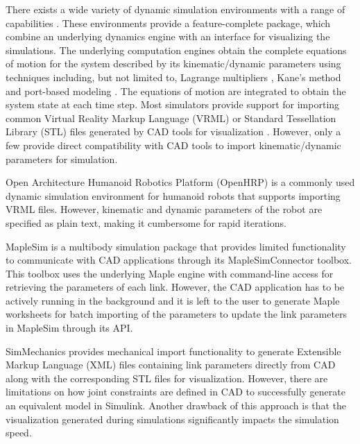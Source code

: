 There exists a wide variety of dynamic simulation environments with a range of capabilities \cite{Koenig04designand,michel2004webotstm, Kanehiro:2004dq, PonticelliCWR2006, Reichenbach2009, MedranoCerda2010}. These environments provide a feature-complete package, which combine an underlying dynamics engine with an interface for visualizing the simulations. The underlying computation engines obtain the complete equations of motion for the system described by its kinematic/dynamic parameters using techniques including, but not limited to, Lagrange multipliers \cite{Baraff1996}, Kane's method \cite{Rosenthal1986} and port-based modeling \cite{Paredis2001}. The equations of motion are integrated to obtain the system state at each time step. Most simulators provide support for importing common Virtual Reality Markup Language (VRML) or Standard Tessellation Library (STL) files generated by CAD tools for visualization \cite{Koenig04designand,michel2004webotstm}. However, only a few provide direct compatibility with CAD tools to import kinematic/dynamic parameters for simulation.

Open Architecture Humanoid Robotics Platform (OpenHRP) \cite{Kanehiro:2004dq} is a commonly used dynamic simulation environment for humanoid robots that supports importing VRML files. However, kinematic and dynamic parameters of the robot are specified as plain text, making it cumbersome for rapid iterations.

MapleSim \cite{sw:maplesim} is a multibody simulation package that provides limited functionality to communicate with CAD applications through its MapleSimConnector toolbox. This toolbox uses the underlying Maple engine with command-line access for retrieving the parameters of each link. However, the CAD application has to be actively running in the background and it is left to the user to generate Maple worksheets for batch importing of the parameters to update the link parameters in MapleSim through its API.

SimMechanics \cite{sw:simmech} provides mechanical import functionality to generate Extensible Markup Language (XML) files containing link parameters directly from CAD along with the corresponding STL files for visualization. However, there are limitations on how joint constraints are defined in CAD to successfully generate an equivalent model in Simulink. Another drawback of this approach is that the visualization generated during simulations significantly impacts the simulation speed.

